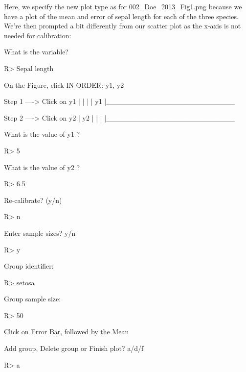 \documentclass[article]{jss}
\begin{document}
Here, we specify the new plot type as  for 002\_Doe\_2013\_Fig1.png because we have a plot of the mean and error of sepal length for each of the three species. We're then prompted a bit differently from our scatter plot as the x-axis is not needed for calibration:

\begin{CodeChunk}
\begin{CodeOutput}
What is the variable? 
\end{CodeOutput}
\begin{CodeInput}
R> Sepal length
\end{CodeInput}
\begin{CodeOutput}
On the Figure, click IN ORDER: 
      y1, y2  


    Step 1 ----> Click on y1
  |
  |
  |
  |
  y1
  |_________________________


    Step 2 ----> Click on y2
  |
  y2
  |
  |
  |
  |_________________________
  
What is the value of y1 ?
\end{CodeOutput}
\begin{CodeInput}
R> 5
\end{CodeInput}
\begin{CodeOutput}
What is the value of y2 ?
\end{CodeOutput}
\begin{CodeInput}
R> 6.5
\end{CodeInput}
\begin{CodeOutput}
Re-calibrate? (y/n) 
\end{CodeOutput}
\begin{CodeInput}
R> n
\end{CodeInput}
\begin{CodeOutput}
Enter sample sizes? y/n 
\end{CodeOutput}
\begin{CodeInput}
R> y
\end{CodeInput}
\begin{CodeOutput}
Group identifier: 
\end{CodeOutput}
\begin{CodeInput}
R> setosa
\end{CodeInput}
\begin{CodeOutput}
Group sample size: 
\end{CodeOutput}
\begin{CodeInput}
R> 50
\end{CodeInput}
\begin{CodeOutput}
Click on Error Bar, followed by the Mean

Add group, Delete group or Finish plot? a/d/f 
\end{CodeOutput}
\begin{CodeInput}
R> a
\end{CodeInput}
\end{CodeChunk}
\end{document}
